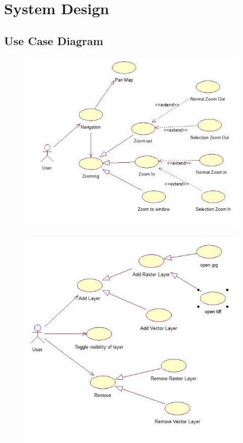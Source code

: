 \chapter{System Design}
\section{Use Case Diagram}
\begin{figure}[h]
\begin{center}
  \includegraphics {Navigation.jpg}
\end{center}
\end{figure}
\begin{figure}[h]
\begin{center}
  \includegraphics {addremove.jpg}
\end{center}
\end{figure}
